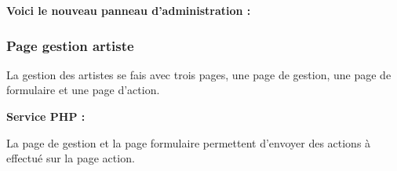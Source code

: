             
            \begin{paragraphe}
                \textbf{Voici le nouveau panneau d'administration :}
            \end{paragraphe}
            
            
    \clearpage

		\subsubsection{Page gestion artiste}
        
            \begin{paragraphe}
                La gestion des artistes se fais avec trois pages, une page de gestion, une page de formulaire et une page d'action.
            \end{paragraphe}

			\begin{paragraphe}
				\textbf{Service PHP :}
			\end{paragraphe}

			\begin{paragraphe}
                La page de gestion et la page formulaire permettent d'envoyer des actions à effectué sur la page action. \\
			\end{paragraphe}

